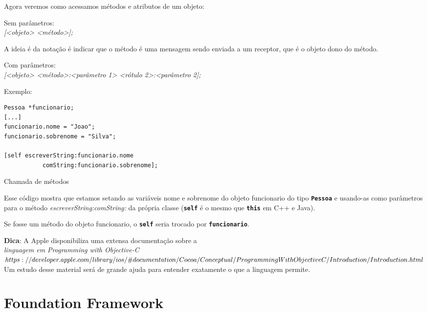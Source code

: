 \documentclass[a4paper,12pt,brazil,doubleside]{book}
\begin{document}
\begin{singlespace}
Agora veremos como acessamos métodos e atributos de um objeto:


Sem parâmetros:\\
\emph{[<objeto> <método>];}


A ideia é da notação é indicar que o método é uma mensagem sendo enviada a um receptor, que é o objeto dono do método.


Com parâmetros:\\
\emph{[<objeto> <método>:<parâmetro 1> <rótulo 2>:<parâmetro 2];}


Exemplo:

\begin{listing}
\begin{verbatim}
Pessoa *funcionario;
[...]
funcionario.nome = "Joao";
funcionario.sobrenome = "Silva";

[self escreverString:funcionario.nome
           comString:funcionario.sobrenome];
\end{verbatim}
\caption{Chamada de métodos}
\end{listing}


Esse código mostra que estamos setando as variáveis nome e sobrenome do objeto funcionario do tipo \texttt{\textbf{Pessoa}} e usando-as como parâmetros para o método \emph{escreverString:comString:} da própria classe (\texttt{\textbf{self}} é o mesmo que \texttt{\textbf{this}} em C++ e Java).

Se fosse um método do objeto funcionario, o \texttt{\textbf{self}} seria trocado por \texttt{\textbf{funcionario}}.

\begin{framed}

\textbf{Dica}: A Apple disponibiliza uma extensa documentação sobre a \textit{\\linguagem em Programming with Objective-C\\ \(https://developer.apple.com/library/ios/\#documentation/Cocoa/Conceptual/\\ProgrammingWithObjectiveC/Introduction/Introduction.html \)\\}
Um estudo desse material será de grande ajuda para entender exatamente o que a linguagem permite.
\end{framed}

\section{Foundation Framework}



\end{singlespace}
\end{document}
